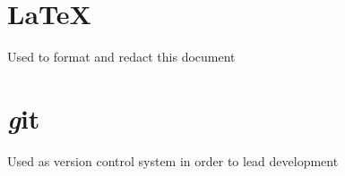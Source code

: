 \section{\LaTeX}
Used to format and redact this document
\section{\textit git}
Used as version control system in order to lead development